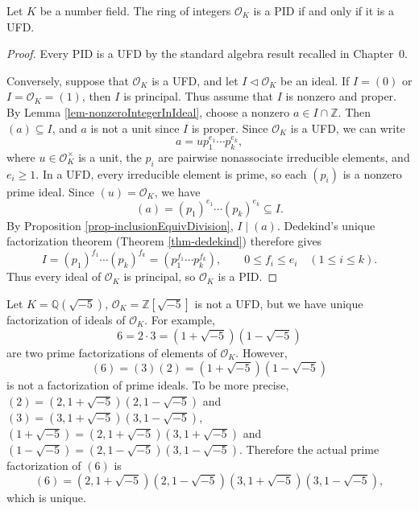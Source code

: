 \begin{corollary}\label{cor-PIDiffUFD}
    Let $K$ be a number field. The ring of integers $\mathcal{O}_{K}$ is a PID if and only if it is a UFD.
\end{corollary}

\begin{proof}
    Every PID is a UFD by the standard algebra result recalled in Chapter~0.

    Conversely, suppose that $\mathcal{O}_{K}$ is a UFD, and let $I\lhd \mathcal{O}_{K}$ be an ideal. If $I=(0)$ or $I=\mathcal{O}_{K}=(1)$, then $I$ is principal. Thus assume that $I$ is nonzero and proper. By Lemma \ref{lem-nonzeroIntegerInIdeal}, choose a nonzero $a\in I\cap\mathbb{Z}$. Then $(a)\subseteq I$, and $a$ is not a unit since $I$ is proper. Since $\mathcal{O}_{K}$ is a UFD, we can write
    \[
    a=u p_{1}^{e_{1}}\cdots p_{k}^{e_{k}},
    \]
    where $u\in\mathcal{O}_{K}^{\times}$ is a unit, the $p_{i}$ are pairwise nonassociate irreducible elements, and $e_{i}\geq 1$. In a UFD, every irreducible element is prime, so each $(p_{i})$ is a nonzero prime ideal. Since $(u)=\mathcal{O}_{K}$, we have
    \[
    (a)=(p_{1})^{e_{1}}\cdots(p_{k})^{e_{k}}\subseteq I.
    \]
    By Proposition \ref{prop-inclusionEquivDivision}, $I\mid(a)$. Dedekind's unique factorization theorem (Theorem \ref{thm-dedekind}) therefore gives
    \[
    I=(p_{1})^{f_{1}}\cdots(p_{k})^{f_{k}}
      =(p_{1}^{f_{1}}\cdots p_{k}^{f_{k}}),
    \qquad 0\leq f_{i}\leq e_{i}\quad (1\leq i\leq k).
    \]
    Thus every ideal of $\mathcal{O}_{K}$ is principal, so $\mathcal{O}_{K}$ is a PID.
\end{proof}

\begin{example}
    Let $K=\mathbb{Q}(\sqrt{-5})$, $\mathcal{O}_{K}=\mathbb{Z}[\sqrt{-5}]$ is not a UFD, but we have unique factorization of ideals of $\mathcal{O}_{K}$. For example, 
    \[
    6=2\cdot 3=(1+\sqrt{-5})(1-\sqrt{-5})
    \]
    are two prime factorizations of elements of $\mathcal{O}_{K}$. However, 
    \[
    (6)=(3)(2)=(1+\sqrt{-5})(1-\sqrt{-5})
    \]
    is not a factorization of prime ideals. 
    To be more precise, $(2)=(2,1+\sqrt{-5})(2,1-\sqrt{-5})$ and $(3)=(3,1+\sqrt{-5})(3,1-\sqrt{-5})$, $(1+\sqrt{-5})=(2,1+\sqrt{-5})(3,1+\sqrt{-5})$ and $(1-\sqrt{-5})=(2,1-\sqrt{-5})(3,1-\sqrt{-5})$. 
    Therefore the actual prime factorization of $(6)$ is 
    \[
    (6)=(2,1+\sqrt{-5})(2,1-\sqrt{-5})(3,1+\sqrt{-5})(3,1-\sqrt{-5}),
    \]
    which is unique. 
\end{example}

